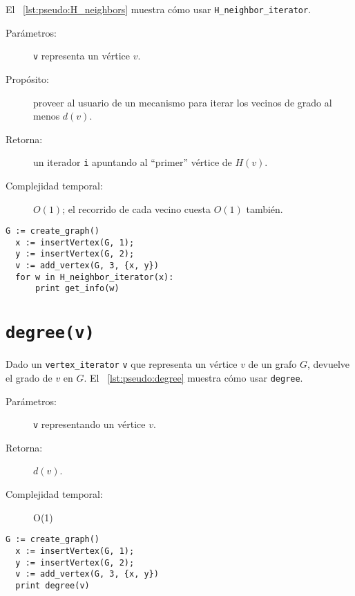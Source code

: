 \documentclass[%
    a4paper,%
    fontsize=12pt,%
    DIV=12,
    twoside,%
    openright,%
    titlepage=true,%
    headsepline,%
    toc=bibliography,%
    parskip=half,%
    cleardoublepage=empty,%
    headings=big,%
]{scrbook}
\makeatletter
\newcommand{\Code}[1]{\lstinline[basicstyle={\ttfamily}]@#1@}
\makeatother
\begin{document}
El \lstlistingname~\ref{lst:pseudo:H_neighbors} muestra cómo usar \Code{H_neighbor_iterator}.


\begin{description}
  \item [Parámetros:] \Code{v} representa un vértice $v$.
  \item [Propósito:] proveer al usuario de un mecanismo para iterar los vecinos de grado al menos $d(v)$.
  \item [Retorna:] un iterador \Code{i} apuntando al ``primer'' vértice de $H(v)$.
  \item [Complejidad temporal:] $O(1)$; el recorrido de cada vecino cuesta $O(1)$ también.
\end{description}


\begin{lstlisting}[caption={Ejemplo de uso de \Code{H_neighbor_iterator} para imprimir 3.},gobble=2,float=ht,label={lst:pseudo:H_neighbors},emph={H_neighbors}]
  G := create_graph()
  x := insertVertex(G, 1);
  y := insertVertex(G, 2);
  v := add_vertex(G, 3, {x, y})
  for w in H_neighbor_iterator(x):
      print get_info(w)
\end{lstlisting}

\section{\texorpdfstring{\Code{degree(v)}}{degree(v)}}
\label{sec:tad grafo:degree}

Dado un \Code{vertex_iterator} \Code{v} que representa un vértice $v$ de un grafo $G$, devuelve el grado de $v$ en $G$.  El \lstlistingname~\ref{lst:pseudo:degree} muestra cómo usar \Code{degree}.


\begin{description}
  \item [Parámetros:] \Code{v} representando un vértice $v$.
  \item [Retorna:] $d(v)$.
  \item [Complejidad temporal:] O(1)
\end{description}


\begin{lstlisting}[caption={Ejemplo de uso de \Code{degree} para imprimir $2$.},gobble=2,float=ht,label={lst:pseudo:degree},emph={degree}]
  G := create_graph()
  x := insertVertex(G, 1);
  y := insertVertex(G, 2);
  v := add_vertex(G, 3, {x, y})
  print degree(v)
\end{lstlisting}
\end{document}
